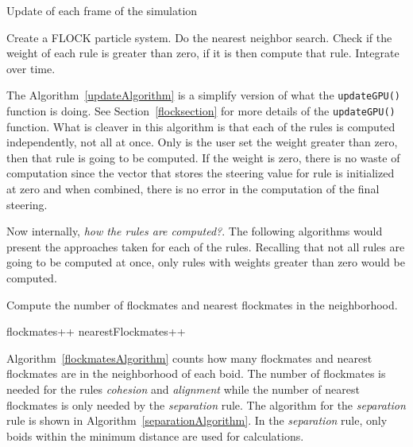\begin{algorithm}
\caption{Update of each frame of the simulation}
\label{updateAlgorithm}
\begin{algorithmic}
\STATE Create a FLOCK particle system.
\STATE Do the nearest neighbor search.
\STATE Check if the weight of each rule is greater than zero, if it is then compute that rule.
\STATE Integrate over time.
\ENDFOR
\end{algorithmic}
\end{algorithm}

The Algorithm~\ref{updateAlgorithm} is a simplify version of what the \texttt{updateGPU()} function is doing. See Section~\ref{flocksection} for more details of the \texttt{updateGPU()} function. What is cleaver in this algorithm is that each of the rules is computed independently, not all at once. Only is the user set the weight greater than zero, then that rule is going to be computed. If the weight is zero, there is no waste of computation since the vector that stores the steering value for rule is initialized at zero and when combined, there is no error in the computation of the final steering.

Now internally, \textit{how the rules are computed?}. The following algorithms would present the approaches taken for each of the rules. Recalling that not all rules are going to be computed at once, only rules with weights greater than zero would be computed.


\begin{algorithm}
\caption{Compute the number of flockmates and nearest flockmates in the neighborhood.}
\label{flockmatesAlgorithm}
\begin{algorithmic}
\STATE flockmates++
\STATE nearestFlockmates++
\ENDIF
\ENDIF
\ENDFOR
\end{algorithmic}
\end{algorithm}

Algorithm~\ref{flockmatesAlgorithm} counts how many flockmates and nearest flockmates are in the neighborhood of each boid. The number of flockmates is needed for the rules \textit{cohesion} and \textit{alignment} while the number of nearest flockmates is only needed by the \textit{separation} rule. The algorithm for the \textit{separation} rule is shown in Algorithm~\ref{separationAlgorithm}. In the \textit{separation} rule, only boids within the minimum distance are used for calculations. 

